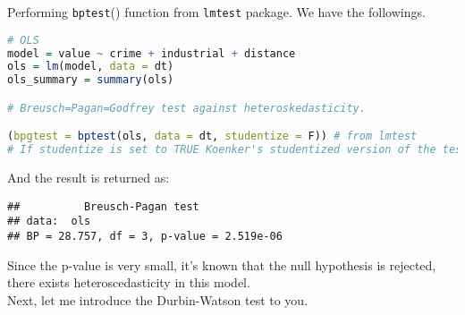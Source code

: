 \documentclass{article}
\theoremstyle{definition}
\begin{document}
Performing \texttt{bptest}() function from \texttt{lmtest} package. We have the followings.\\

\begin{lstlisting}[language=R]
# OLS
model = value ~ crime + industrial + distance
ols = lm(model, data = dt)
ols_summary = summary(ols)

# Breusch=Pagan=Godfrey test against heteroskedasticity.

(bpgtest = bptest(ols, data = dt, studentize = F)) # from lmtest
# If studentize is set to TRUE Koenker's studentized version of the test statistic will be used.
\end{lstlisting}

And the result is returned as:\\

\begin{verbatim}
## 			Breusch-Pagan test
## data:  ols
## BP = 28.757, df = 3, p-value = 2.519e-06
\end{verbatim}

Since the p-value is very small, it's known that the null hypothesis is rejected, there exists heteroscedasticity in this model.\\[48pt]

Next, let me introduce the Durbin-Watson test to you.\\
\end{document}

